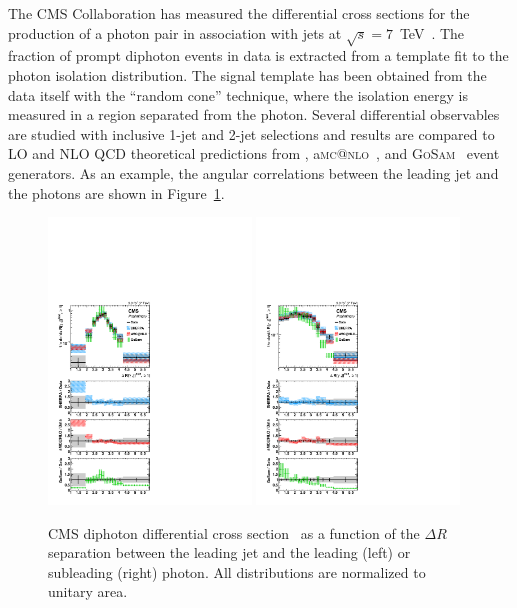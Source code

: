 \documentclass{PoS}
\makeatletter
\newcommand{\AMCATNLO} {a{\textsc{mc@nlo}}\xspace}
\newcommand{\GOSAM} {{\textsc{GoSam}}\xspace}
\makeatother
\begin{document}
The CMS Collaboration has measured the differential cross sections for the production of a photon pair in association with
jets at $\sqrt{s}=7$~TeV~\cite{CMS:2015hha}. The fraction of prompt diphoton events in data is extracted from a template fit to the photon
isolation distribution. The signal template has been obtained from the data itself with the ``random cone''
technique, where the isolation energy is measured in a region separated from the photon. Several differential observables are
studied with inclusive 1-jet and 2-jet selections and results are compared to LO and NLO QCD theoretical predictions
from \SHERPA, \AMCATNLO~\cite{Alwall:2014hca}, and \GOSAM~\cite{Gehrmann:2013aga} event generators. As an example, the
angular correlations between the leading jet and the photons are shown in Figure~\ref{fig:diphot}. 
\begin{figure}
\begin{center}
\includegraphics[width=0.48\textwidth]{Figure13a.pdf}
\includegraphics[width=0.48\textwidth]{Figure13b.pdf}
\caption{CMS diphoton differential cross section~\cite{CMS:2015hha} as a function of the $\Delta R$ separation between the leading jet and the leading (left) or subleading (right) photon. All distributions are normalized to unitary area.}
\label{fig:diphot}
\end{center}
\end{figure}
\end{document}
